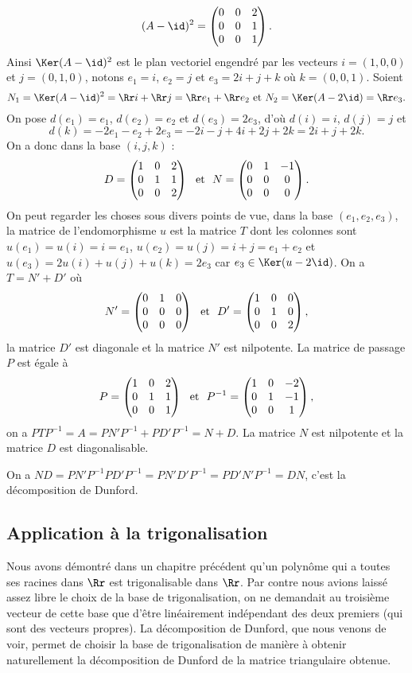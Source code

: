 \documentclass[class=report,crop=false]{standalone}
\begin{document}
\begin{exemple}
$$(A-\id)^2=\left(\begin{matrix}0&0&2\cr0&0&1\cr0&0&1\end{matrix}\right).$$
Ainsi $\Ker(A-\id)^2$ est le plan vectoriel engendré par les vecteurs $i=(1,0,0)$ et $j=(0,1,0)$, notons 
$e_1=i$, $e_2=j$ et $e_3=2i+j+k$ où $k=(0,0,1)$. Soient $$N_1=\Ker(A-\id)^2=\Rr i+\Rr j=\Rr e_1+\Rr e_2\ {\hbox{et}}\  
N_2=\Ker(A-2\id)=\Rr e_3.$$ On pose $d(e_1)=e_1$, $d(e_2)=e_2$ et $d(e_3)=2e_3$, d'où $d(i)=i$, $d(j)=j$ et 
$$d(k)=-2e_1-e_2+2e_3=-2i-j+4i+2j+2k=2i+j+2k.$$
On a donc dans la base $(i,j,k)$ :
$$D=\left(\begin{matrix}1&0&2\cr 0&1&1\cr 0&0&2\end{matrix}\right)\ \ {\hbox{et}}\ \ N=\left(\begin{matrix}0&1&-1\cr 0&0&0\cr 0&0&0\end{matrix}\right).$$
On peut regarder les choses sous divers points de vue, dans la base $(e_1,e_2,e_3)$, la matrice de l'endomorphisme $u$ est la matrice $T$ dont les colonnes sont $u(e_1)=u(i)=i=e_1$, $u(e_2)=u(j)=i+j=e_1+e_2$ et $u(e_3)=2u(i)+u(j)+u(k)=2e_3$ car $e_3\in\Ker(u-2\id)$. On a $T=N'+D'$ où 
$$N'=\left(\begin{matrix}0&1&0\cr 0&0&0\cr 0&0&0\end{matrix}\right)\ \ {\hbox{et}}\ \ D'=\left(\begin{matrix}1&0&0\cr 0&1&0\cr 0&0&2\end{matrix}\right),$$
la matrice $D'$ est diagonale et la matrice $N'$ est nilpotente. La matrice de passage $P$ est égale à
$$P=\left(\begin{matrix}1&0&2\cr 0&1&1\cr 0&0&1\end{matrix}\right)\ \ {\hbox{et}}\ \ P^{-1}=\left(\begin{matrix}1&0&-2\cr 0&1&-1\cr 0&0&1\end{matrix}\right),$$
on a $PTP^{-1}=A=PN'P^{-1}+PD'P^{-1}=N+D$. La matrice $N$ est nilpotente et la matrice $D$ est diagonalisable.

On a $ND=PN'P^{-1}PD'P^{-1}=PN'D'P^{-1}=PD'N'P^{-1}=DN$, c'est la décomposition de Dunford.
\end{exemple}


\subsection*{Application à la trigonalisation}

Nous avons démontré dans un chapitre précédent qu'un polynôme 
qui a toutes ses racines dans $\Rr$ est trigonalisable dans $\Rr$. 
Par contre nous avions laissé assez libre le choix de la base de 
trigonalisation, on ne demandait au troisième vecteur de cette base 
que d'être linéairement indépendant des deux premiers (qui sont des vecteurs propres). 
La décomposition de Dunford, que nous venons de voir, permet de choisir la 
base de trigonalisation de manière à obtenir naturellement la décomposition 
de Dunford de la matrice triangulaire obtenue.
\end{document}

